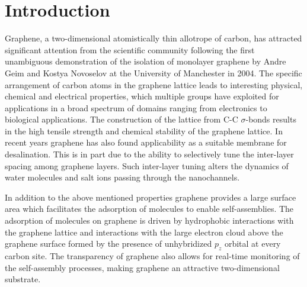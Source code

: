 \chapter[Introduction]{Introduction}

Graphene, a two-dimensional atomistically thin allotrope of carbon, has attracted significant attention from the scientific community following the first unambiguous demonstration of the isolation of monolayer graphene by Andre Geim and Kostya Novoselov at the University of Manchester in 2004\cite{geim_rise_2007, geim_graphene_2009}. The specific arrangement of carbon atoms in the graphene lattice leads to interesting physical, chemical and electrical properties, which multiple groups have exploited for applications in a broad spectrum of domains\cite{berman_few_2013,chen_oxidation_2011, cui_cautionary_2017, su_impermeable_2014, berry_impermeability_2013, hayatdavoudi_mechanistic_2017} ranging from electronics\cite{moreno_bottom-up_2018, fan_graphene_2019,sun_graphene_2010, kim_graphene-contact_2012, avouris_graphene_2010, baeumer_ferroelectrically_2015, bao_atomic-layer_2009,blake_graphene-based_2008, trung_graphene_2022,wang_transparent_2008, liu_ultratransparent_2017, shin_stretchable_2019,kim_large-scale_2009, polat_graphene_2014, anagnostopoulos_mechanical_2016,bae_roll--roll_2010, khan_graphene_2017} to biological applications\cite{akinwande_large-area_2015,lalwani_two-dimensional_2013,mohanty_graphene-based_2008,ohno_label-free_2010,chen_electronic_2012,he_graphene_2010}. The construction of the lattice from C-C $\sigma$-bonds results in the high tensile strength and chemical stability of the graphene lattice.\cite{booth_macroscopic_2008, lee_measurement_2008} In recent years graphene has also found applicability as a suitable membrane for desalination. This is  in part due to the ability to selectively tune the inter-layer spacing among graphene layers. Such inter-layer tuning alters the dynamics of water molecules and salt ions passing through the nanochannels.\cite{abraham_tunable_2017, nair_unimpeded_2012, gopinadhan_complete_2019, radha_molecular_2016, saini_selective_2022, yang_self-assembly_2018, paechotrattanakul_ultrahigh_2023, gao_confined_2022, gao_graphene_2022}

In addition to the above mentioned properties graphene provides a large surface area which facilitates the adsorption of molecules to enable self-assemblies. The adsorption of molecules on graphene is driven by hydrophobic interactions with the graphene lattice and interactions with the large electron cloud above the graphene surface formed by the presence of unhybridized $p_z$ orbital at every carbon site. The transparency of graphene also allows for real-time monitoring of the self-assembly processes, making graphene an attractive two-dimensional substrate.\cite{xu_coadsorption_2006, zhao_investigating_2016, hason_arrangements_2023, xu_directional_2021, garah_guanosine-based_2015, hughes_adsorption_2017, hassan_interactions_2014, hsun_su_electrostatic_2011} 

